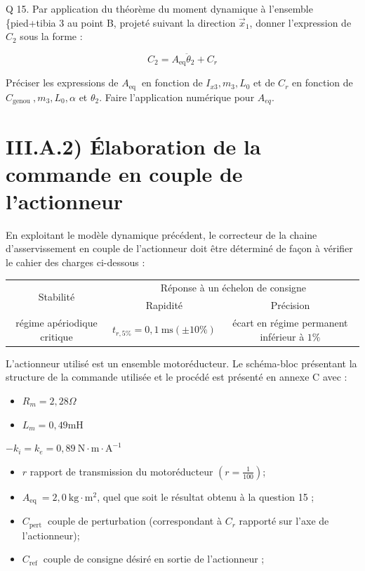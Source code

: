 \documentclass[10pt]{article}
\begin{document}
Q 15. Par application du théorème du moment dynamique à l'ensemble \{pied+tibia 3 au point B, projeté suivant la direction $\vec{x}_{1}$, donner l'expression de $C_{2}$ sous la forme :

$$
C_{2}=A_{\mathrm{eq}} \ddot{\theta}_{2}+C_{r}
$$

Préciser les expressions de $A_{\text {eq }}$ en fonction de $I_{x 3}, m_{3}, L_{0}$ et de $C_{r}$ en fonction de $C_{\text {genou }}, m_{3}, L_{0}, \alpha$ et $\theta_{2}$. Faire l'application numérique pour $A_{e q}$.

\section{III.A.2) Élaboration de la commande en couple de l'actionneur}
En exploitant le modèle dynamique précédent, le correcteur de la chaine d'asservissement en couple de l'actionneur doit être déterminé de façon à vérifier le cahier des charges ci-dessous :

\begin{center}
\begin{tabular}{|c|c|c|}
\hline
\multirow{2}{*}{Stabilité} & \multicolumn{2}{|c|}{Réponse à un échelon de consigne} \\
\cline { 2 - 3 }
 & Rapidité & Précision \\
\hline
régime apériodique critique & $t_{r, 5 \%}=0,1 \mathrm{~ms}( \pm 10 \%)$ & écart en régime permanent inférieur à $1 \%$ \\
\hline
\end{tabular}
\end{center}

L'actionneur utilisé est un ensemble motoréducteur. Le schéma-bloc présentant la structure de la commande utilisée et le procédé est présenté en annexe C avec :

\begin{itemize}
  \item $R_{m}=2,28 \Omega$

  \item $L_{m}=0,49 \mathrm{mH}$

\end{itemize}

$-k_{i}=k_{e}=0,89 \mathrm{~N} \cdot \mathrm{m} \cdot \mathrm{A}^{-1}$

\begin{itemize}
  \item $r$ rapport de transmission du motoréducteur $\left(r=\frac{1}{100}\right)$;

  \item $A_{\text {eq }}=2,0 \mathrm{~kg} \cdot \mathrm{m}^{2}$, quel que soit le résultat obtenu à la question 15 ;

  \item $C_{\text {pert }}$ couple de perturbation (correspondant à $C_{r}$ rapporté sur l'axe de l'actionneur);

  \item $C_{\text {ref }}$ couple de consigne désiré en sortie de l'actionneur ;

\end{itemize}
\end{document}
